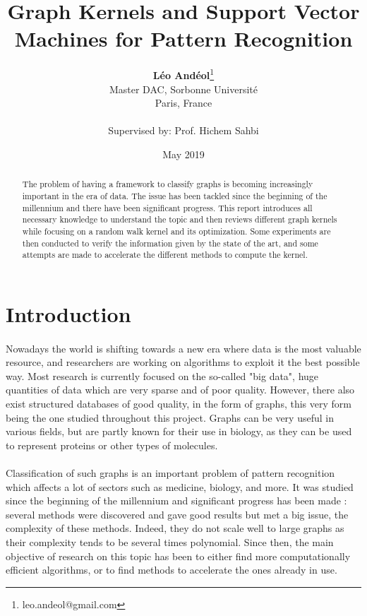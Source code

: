\documentclass{article}
\title{Graph Kernels and Support Vector Machines for Pattern Recognition}
\author{\textbf{Léo Andéol}\thanks{leo.andeol@gmail.com}\\ Master DAC, Sorbonne Université\\ Paris, France\\\\ \footnotesize Supervised by: Prof. Hichem Sahbi}
\date{May 2019}
\theoremstyle{definition}
\begin{document}
\maketitle
\begin{abstract}
	The problem of having a framework to classify graphs is becoming increasingly important in the era of data. The issue has been tackled since the beginning of the millennium and there have been significant progress. This report introduces all necessary knowledge to understand the topic and then reviews different graph kernels while focusing on a random walk kernel and its optimization. Some experiments are then conducted to verify the information given by the state of the art, and some attempts are made to accelerate the different methods to compute the kernel.  
\end{abstract}

\newpage

\tableofcontents

\newpage

\section{Introduction}
 \paragraph{}Nowadays the world is shifting towards a new era where data is the most valuable resource, and researchers are working on algorithms to exploit it the best possible way. Most research is currently focused on the so-called "big data", huge quantities of data which are very sparse and of poor quality. However, there also exist structured databases of good quality, in the form of graphs, this very form being the one studied throughout this project. Graphs can be very useful in various fields, but are partly known for their use in biology, as they can be used to represent proteins or other types of molecules.
 \paragraph{}Classification of such graphs is an important problem of pattern recognition which affects a lot of sectors such as medicine, biology, and more. It was studied since the beginning of the millennium and significant progress has been made : several methods were discovered and gave good results but met a big issue, the complexity of these methods. Indeed, they do not scale well to large graphs as their complexity tends to be several times polynomial. Since then, the main objective of research on this topic has been to either find more computationally efficient algorithms, or to find methods to accelerate the ones already in use.
\end{document}
